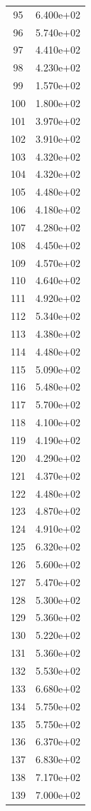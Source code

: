 \documentclass[12pt]{article}
\begin{document}
\begin{longtable}{@{}cc@{}}
95 & 6.400e+02 \\
96 & 5.740e+02 \\
97 & 4.410e+02 \\
98 & 4.230e+02 \\
99 & 1.570e+02 \\
100 & 1.800e+02 \\
101 & 3.970e+02 \\
102 & 3.910e+02 \\
103 & 4.320e+02 \\
104 & 4.320e+02 \\
105 & 4.480e+02 \\
106 & 4.180e+02 \\
107 & 4.280e+02 \\
108 & 4.450e+02 \\
109 & 4.570e+02 \\
110 & 4.640e+02 \\
111 & 4.920e+02 \\
112 & 5.340e+02 \\
113 & 4.380e+02 \\
114 & 4.480e+02 \\
115 & 5.090e+02 \\
116 & 5.480e+02 \\
117 & 5.700e+02 \\
118 & 4.100e+02 \\
119 & 4.190e+02 \\
120 & 4.290e+02 \\
121 & 4.370e+02 \\
122 & 4.480e+02 \\
123 & 4.870e+02 \\
124 & 4.910e+02 \\
125 & 6.320e+02 \\
126 & 5.600e+02 \\
127 & 5.470e+02 \\
128 & 5.300e+02 \\
129 & 5.360e+02 \\
130 & 5.220e+02 \\
131 & 5.360e+02 \\
132 & 5.530e+02 \\
133 & 6.680e+02 \\
134 & 5.750e+02 \\
135 & 5.750e+02 \\
136 & 6.370e+02 \\
137 & 6.830e+02 \\
138 & 7.170e+02 \\
139 & 7.000e+02 \\

\end{longtable}
\end{document}

